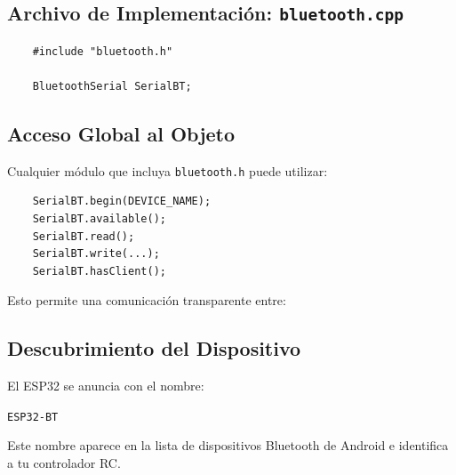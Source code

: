 \documentclass[12pt,a4paper]{article}
\newcommand{\ardfnDG}[1]{\texttt{\textcolor{arduinoTeal}{#1}}}
\begin{document}
\subsection{Archivo de Implementación: \ardfnDG{bluetooth.cpp}}

\begin{lstlisting}
	#include "bluetooth.h"
	
	BluetoothSerial SerialBT;
\end{lstlisting}

\subsection{Acceso Global al Objeto}

Cualquier módulo que incluya \ardfnDG{bluetooth.h} puede utilizar:

\begin{lstlisting}
	SerialBT.begin(DEVICE_NAME);
	SerialBT.available();
	SerialBT.read();
	SerialBT.write(...);
	SerialBT.hasClient();
\end{lstlisting}

Esto permite una comunicación transparente entre:

\begin{center}
\end{center}

\subsection{Descubrimiento del Dispositivo}

El ESP32 se anuncia con el nombre:

\hspace*{2em}\ardfnDG{ESP32-BT}

Este nombre aparece en la lista de dispositivos Bluetooth de Android
e identifica a tu controlador RC.
\end{document}
